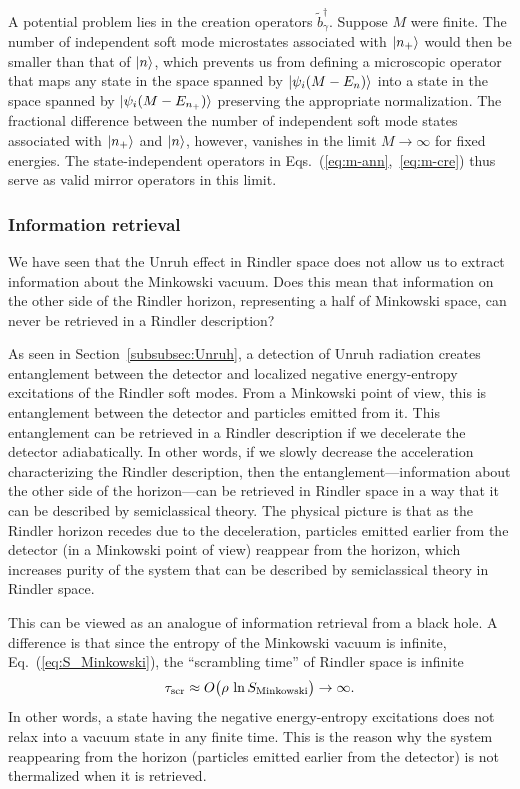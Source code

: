 \documentclass[12pt]{article}
\begin{document}
A potential problem lies in the creation operators 
$\tilde{b}_\gamma^\dagger$.  Suppose $M$ were finite. 
The number of independent soft mode microstates associated 
with $| n_+ \rangle$ would then be smaller than that of $| n \rangle$, 
which prevents us from defining a microscopic operator that maps 
any state in the space spanned by $| \psi_i(M-E_n) \rangle$ into a 
state in the space spanned by $| \psi_i(M-E_{n_+}) \rangle$ preserving 
the appropriate normalization.  The fractional difference between 
the number of independent soft mode states associated with 
$| n_+ \rangle$ and $| n \rangle$, however, vanishes in the limit 
$M \rightarrow \infty$ for fixed energies.  The state-independent 
operators in Eqs.~(\ref{eq:m-ann},~\ref{eq:m-cre}) thus serve 
as valid mirror operators in this limit.

\subsubsection{Information retrieval}
\label{subsubsec:info}

We have seen that the Unruh effect in Rindler space does not allow 
us to extract information about the Minkowski vacuum.  Does this 
mean that information on the other side of the Rindler horizon, 
representing a half of Minkowski space, can never be retrieved in 
a Rindler description?

As seen in Section~\ref{subsubsec:Unruh}, a detection of Unruh 
radiation creates entanglement between the detector and localized 
negative energy-entropy excitations of the Rindler soft modes. 
From a Minkowski point of view, this is entanglement between 
the detector and particles emitted from it.  This entanglement 
can be retrieved in a Rindler description if we decelerate the 
detector adiabatically.  In other words, if we slowly decrease 
the acceleration characterizing the Rindler description, then the 
entanglement---information about the other side of the horizon---can 
be retrieved in Rindler space in a way that it can be described 
by semiclassical theory.  The physical picture is that as the 
Rindler horizon recedes due to the deceleration, particles emitted 
earlier from the detector (in a Minkowski point of view) reappear 
from the horizon, which increases purity of the system that can 
be described by semiclassical theory in Rindler space.

This can be viewed as an analogue of information retrieval from 
a black hole.  A difference is that since the entropy of the 
Minkowski vacuum is infinite, Eq.~(\ref{eq:S_Minkowski}), the 
``scrambling time'' of Rindler space is infinite
%
\begin{equation}
  \tau_{\rm scr} \approx O\bigl(\rho\, \ln S_{\rm Minkowski}\bigr) 
  \rightarrow \infty.
\label{eq:tau_scr}
\end{equation}
%
In other words, a state having the negative energy-entropy 
excitations does not relax into a vacuum state in any finite 
time.  This is the reason why the system reappearing from the 
horizon (particles emitted earlier from the detector) is not 
thermalized when it is retrieved.
\end{document}
